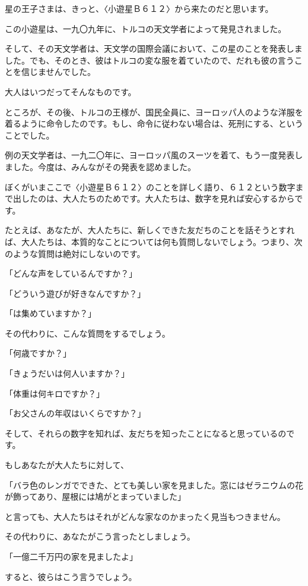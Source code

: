 星の王子さまは、きっと、〈小遊星Ｂ６１２〉から来たのだと思います。


この小遊星は、一九〇九年に、トルコの天文学者によって発見されました。

そして、その天文学者は、天文学の国際会議において、この星のことを発表しました。でも、そのとき、彼はトルコの変な服を着ていたので、だれも彼の言うことを信じませんでした。

大人はいつだってそんなものです。

ところが、その後、トルコの王様が、国民全員に、ヨーロッパ人のような洋服を着るように命令したのです。もし、命令に従わない場合は、死刑にする、ということでした。

例の天文学者は、一九二〇年に、ヨーロッパ風のスーツを着て、もう一度発表しました。今度は、みんながその発表を認めました。

ぼくがいまここで〈小遊星Ｂ６１２〉のことを詳しく語り、６１２という数字まで出したのは、大人たちのためです。大人たちは、数字を見れば安心するからです。

たとえば、あなたが、大人たちに、新しくできた友だちのことを話そうとすれば、大人たちは、本質的なことについては何も質問しないでしょう。つまり、次のような質問は絶対にしないのです。

「どんな声をしているんですか？」

「どういう遊びが好きなんですか？」

「は集めていますか？」

その代わりに、こんな質問をするでしょう。

「何歳ですか？」

「きょうだいは何人いますか？」

「体重は何キロですか？」

「お父さんの年収はいくらですか？」

そして、それらの数字を知れば、友だちを知ったことになると思っているのです。

もしあなたが大人たちに対して、

「バラ色のレンガでできた、とても美しい家を見ました。窓にはゼラニウムの花が飾ってあり、屋根には鳩がとまっていました」

と言っても、大人たちはそれがどんな家なのかまったく見当もつきません。

その代わりに、あなたがこう言ったとしましょう。

「一億二千万円の家を見ましたよ」

すると、彼らはこう言うでしょう。

